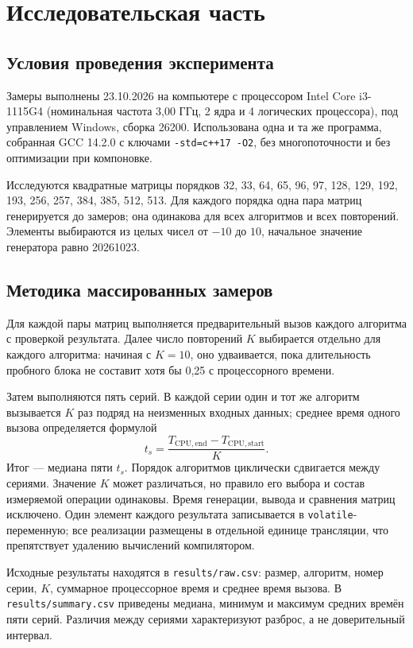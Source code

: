 \documentclass[14pt,a4paper]{extarticle}
\numberwithin{equation}{section}
\begin{document}
\clearpage\section{Исследовательская часть}
\subsection{Условия проведения эксперимента}
Замеры выполнены 23.10.2026 на компьютере с процессором Intel Core i3-1115G4 (номинальная частота 3,00 ГГц, 2 ядра и 4 логических процессора), под управлением Windows, сборка 26200. Использована одна и та же программа, собранная GCC 14.2.0 с ключами \texttt{-std=c++17 -O2}, без многопоточности и без оптимизации при компоновке.

Исследуются квадратные матрицы порядков 32, 33, 64, 65, 96, 97, 128, 129, 192, 193, 256, 257, 384, 385, 512, 513. Для каждого порядка одна пара матриц генерируется до замеров; она одинакова для всех алгоритмов и всех повторений. Элементы выбираются из целых чисел от $-10$ до $10$, начальное значение генератора равно 20261023.

\subsection{Методика массированных замеров}
Для каждой пары матриц выполняется предварительный вызов каждого алгоритма с проверкой результата. Далее число повторений $K$ выбирается отдельно для каждого алгоритма: начиная с $K=10$, оно удваивается, пока длительность пробного блока не составит хотя бы 0,25 с процессорного времени.

Затем выполняются пять серий. В каждой серии один и тот же алгоритм вызывается $K$ раз подряд на неизменных входных данных; среднее время одного вызова определяется формулой
\begin{equation}
t_s=\frac{T_{\mathrm{CPU},\mathrm{end}}-T_{\mathrm{CPU},\mathrm{start}}}{K}.
\end{equation}
Итог — медиана пяти $t_s$. Порядок алгоритмов циклически сдвигается между сериями. Значение $K$ может различаться, но правило его выбора и состав измеряемой операции одинаковы. Время генерации, вывода и сравнения матриц исключено. Один элемент каждого результата записывается в \texttt{volatile}-переменную; все реализации размещены в отдельной единице трансляции, что препятствует удалению вычислений компилятором.

Исходные результаты находятся в \texttt{results/raw.csv}: размер, алгоритм, номер серии, $K$, суммарное процессорное время и среднее время вызова. В \texttt{results/summary.csv} приведены медиана, минимум и максимум средних времён пяти серий. Различия между сериями характеризуют разброс, а не доверительный интервал.
\end{document}

